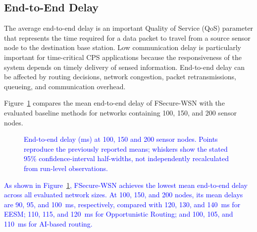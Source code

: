 \documentclass[pdflatex,sn-mathphys-num]{sn-jnl}
\newcommand{\Revised}[1]{\textcolor{blue}{#1}}
\begin{document}
\subsection{End-to-End Delay}

The average end-to-end delay is an important Quality of Service (QoS)
parameter that represents the time required for a data packet to travel from
a source sensor node to the destination base station. Low communication
delay is particularly important for time-critical CPS applications because
the responsiveness of the system depends on timely delivery of sensed
information. End-to-end delay can be affected by routing decisions, network
congestion, packet retransmissions, queueing, and communication overhead.

Figure~\ref{fig:delay} compares the mean end-to-end delay of FSecure-WSN with
the evaluated baseline methods for networks containing 100, 150, and 200
sensor nodes.

\begin{figure}[!tb]
\centering
{}
\caption{\Revised{End-to-end delay (ms) at 100, 150 and 200 sensor nodes. Points reproduce the previously reported means; whiskers show the stated 95\% confidence-interval half-widths, not independently recalculated from run-level observations.}}
\label{fig:delay}
\end{figure}

\textcolor{blue}{As shown in Figure~\ref{fig:delay}, FSecure-WSN achieves
the lowest mean end-to-end delay across all evaluated network sizes. At
100, 150, and 200 nodes, its mean delays are 90, 95, and 100~ms,
respectively, compared with 120, 130, and 140~ms for EESM; 110, 115, and
120~ms for Opportunistic Routing; and 100, 105, and 110~ms for AI-based
routing.}
\end{document}
